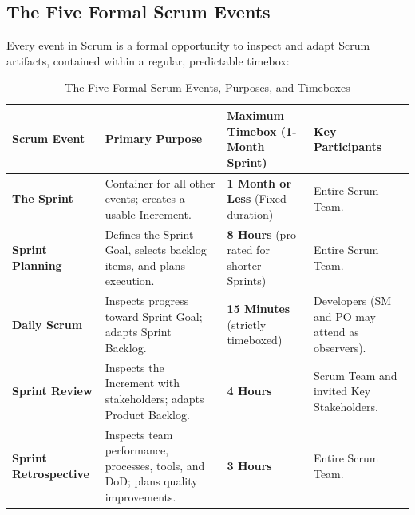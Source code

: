 \subsection{The Five Formal Scrum Events}
Every event in Scrum is a formal opportunity to inspect and adapt Scrum artifacts, contained within a regular, predictable timebox:
\begin{table}[htbp]
\centering
\small
\caption{The Five Formal Scrum Events, Purposes, and Timeboxes}
\label{tab:scrum_events}
\begin{tabularx}{\textwidth}{l p{4.2cm} p{3.2cm} X}
\toprule
\textbf{Scrum Event} & \textbf{Primary Purpose} & \textbf{Maximum Timebox (1-Month Sprint)} & \textbf{Key Participants} \\
\midrule
\textbf{The Sprint} & Container for all other events; creates a usable Increment. & \textbf{1 Month or Less} (Fixed duration) & Entire Scrum Team. \\
\textbf{Sprint Planning} & Defines the Sprint Goal, selects backlog items, and plans execution. & \textbf{8 Hours} (pro-rated for shorter Sprints) & Entire Scrum Team. \\
\textbf{Daily Scrum} & Inspects progress toward Sprint Goal; adapts Sprint Backlog. & \textbf{15 Minutes} (strictly timeboxed) & Developers (SM and PO may attend as observers). \\
\textbf{Sprint Review} & Inspects the Increment with stakeholders; adapts Product Backlog. & \textbf{4 Hours} & Scrum Team and invited Key Stakeholders. \\
\textbf{Sprint Retrospective} & Inspects team performance, processes, tools, and DoD; plans quality improvements. & \textbf{3 Hours} & Entire Scrum Team. \\
\bottomrule
\end{tabularx}
\end{table}


